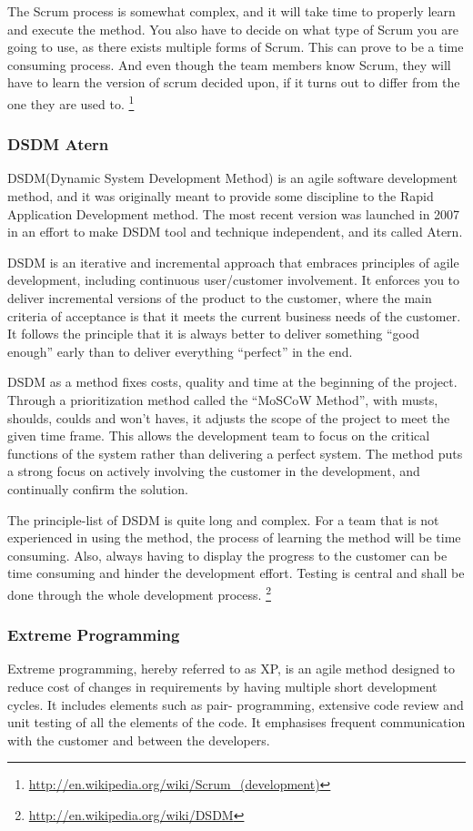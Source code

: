 The Scrum process is somewhat complex, and it will take time to properly learn and execute the method. You also have to decide on what type of Scrum you are going to use, as there exists multiple forms of Scrum. This can prove to be a time consuming process. And even though the team members know Scrum, they will have to learn the version of scrum decided upon, if it turns out to differ from the one they are used to.
\footnote{\url{http://en.wikipedia.org/wiki/Scrum_(development)}}

\subsubsection{DSDM Atern}
DSDM(Dynamic System Development Method) is an agile software development method, and it was originally meant to provide some discipline to the Rapid Application Development method. The most recent version was launched in 2007 in an effort to make DSDM tool and technique independent, and its called Atern. 

DSDM is an iterative and incremental approach that embraces principles of agile development, including continuous user/customer involvement. It enforces you to deliver incremental versions of the product to the customer, where the main criteria of acceptance is that it meets the current business needs of the customer. It follows the principle that it is always better to deliver something “good enough” early than to deliver everything “perfect” in the end.

DSDM as a method fixes costs, quality and time at the beginning of the project. Through a prioritization method called the “MoSCoW Method”, with musts, shoulds, coulds and won’t haves, it adjusts the scope of the project to meet the given time frame. This allows the development team to focus on the critical functions of the system rather than delivering a perfect system. The method puts a strong focus on actively involving the customer in the development, and continually confirm the solution.

The principle-list of DSDM is quite long and complex. For a team that is not experienced in using the method, the process of learning the method will be time consuming. Also, always having to display the progress to the customer can be time consuming and hinder the development effort. 
Testing is central and shall be done through the whole development process.
\footnote{\url{http://en.wikipedia.org/wiki/DSDM}}

\subsubsection{Extreme Programming}
Extreme programming, hereby referred to as XP, is an agile method designed to reduce cost of changes in requirements by having multiple short development cycles. It includes elements such as pair- programming, extensive code review and unit testing of all the elements of the code. It emphasises frequent communication with the customer and between the developers.

